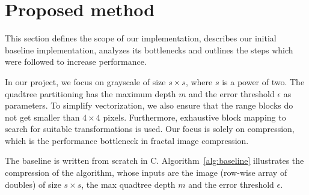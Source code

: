 \section{Proposed method}\label{sec:yourmethod}

This section defines the scope of our implementation, describes our initial baseline
implementation, analyzes its bottlenecks and outlines the steps which were followed to
increase performance.

In our project, we focus on grayscale of size $s \times s$, where $s$ is a power of two.
The quadtree partitioning has the maximum depth $m$ and the error threshold $\epsilon$ as parameters.
To simplify vectorization, we also ensure that the range blocks do not get smaller than $4 \times 4$ pixels.
Furthermore, exhaustive block mapping to search for suitable transformations is used.
Our focus is solely on compression, which is the performance bottleneck in fractal image compression.

The baseline is written from scratch in C. Algorithm~\ref{alg:baseline} illustrates the compression of the algorithm,
whose inputs are the image (row-wise array of doubles) of size $s \times s$, the max quadtree depth $m$ and the error threshold $\epsilon$.

